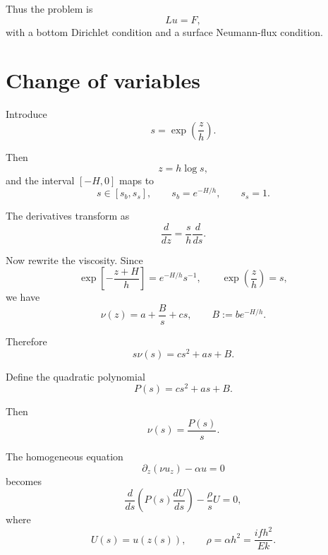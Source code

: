 \documentclass[10pt]{amsart}
\begin{document}
Thus the problem is
\begin{equation}
L u = F,
\end{equation}
with a bottom Dirichlet condition and a surface Neumann-flux condition.

\section{Change of variables}

Introduce
\begin{equation}
s=\exp\!\left(\frac{z}{h}\right).
\label{eq:s_def}
\end{equation}

Then
\[
z=h\log s,
\]
and the interval \([-H,0]\) maps to
\begin{equation}
s\in[s_b,s_s],
\qquad
s_b=e^{-H/h},
\qquad
s_s=1.
\end{equation}

The derivatives transform as
\begin{equation}
\frac{d}{dz}
=
\frac{s}{h}\frac{d}{ds}.
\end{equation}

Now rewrite the viscosity. Since
\[
\exp\!\left[-\frac{z+H}{h}\right]
=
e^{-H/h}s^{-1},
\qquad
\exp\!\left(\frac{z}{h}\right)=s,
\]
we have
\begin{equation}
\nu(z)
=
a+\frac{B}{s}+c s,
\qquad
B:=b e^{-H/h}.
\label{eq:nu_s}
\end{equation}

Therefore
\begin{equation}
s\nu(s)
=
c s^2+a s+B.
\end{equation}

Define the quadratic polynomial
\begin{equation}
P(s)
=
c s^2+a s+B.
\label{eq:P_def}
\end{equation}

Then
\begin{equation}
\nu(s)=\frac{P(s)}{s}.
\end{equation}

The homogeneous equation
\begin{equation}
\partial_z(\nu u_z)-\alpha u=0
\label{eq:hom_z}
\end{equation}
becomes
\begin{equation}
\frac{d}{ds}
\left(
P(s)\frac{dU}{ds}
\right)
-
\frac{\rho}{s}U=0,
\label{eq:hom_s_conservative}
\end{equation}
where
\begin{equation}
U(s)=u(z(s)),
\qquad
\rho=\alpha h^2
=
\frac{i f h^2}{E k}.
\label{eq:rho_def}
\end{equation}
\end{document}
